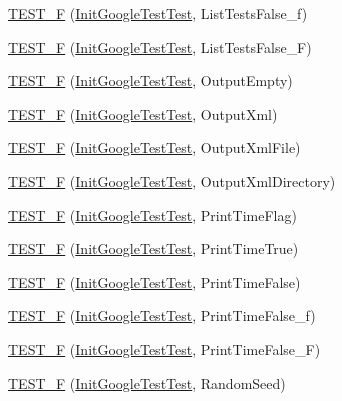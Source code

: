 \begin{DoxyCompactItemize}
\hyperlink{namespacetesting_a60e2b7e1cf88c2af6e04055b3afe7cbe}{T\+E\+S\+T\+\_\+F} (\hyperlink{classtesting_1_1_init_google_test_test}{Init\+Google\+Test\+Test}, List\+Tests\+False\+\_\+f)
\item 
\hyperlink{namespacetesting_a4933b012108ecb88243c2dbc13d7665b}{T\+E\+S\+T\+\_\+F} (\hyperlink{classtesting_1_1_init_google_test_test}{Init\+Google\+Test\+Test}, List\+Tests\+False\+\_\+F)
\item 
\hyperlink{namespacetesting_a121894d4edf72b1dbabdcde2bebd745d}{T\+E\+S\+T\+\_\+F} (\hyperlink{classtesting_1_1_init_google_test_test}{Init\+Google\+Test\+Test}, Output\+Empty)
\item 
\hyperlink{namespacetesting_a90df70c45f67d4c0dbc5bd29f7be3361}{T\+E\+S\+T\+\_\+F} (\hyperlink{classtesting_1_1_init_google_test_test}{Init\+Google\+Test\+Test}, Output\+Xml)
\item 
\hyperlink{namespacetesting_a810f99da1185404f8a899c919ee6433e}{T\+E\+S\+T\+\_\+F} (\hyperlink{classtesting_1_1_init_google_test_test}{Init\+Google\+Test\+Test}, Output\+Xml\+File)
\item 
\hyperlink{namespacetesting_ac351c3065ee89f7eb2fbba809db5c61d}{T\+E\+S\+T\+\_\+F} (\hyperlink{classtesting_1_1_init_google_test_test}{Init\+Google\+Test\+Test}, Output\+Xml\+Directory)
\item 
\hyperlink{namespacetesting_aa832ff8ffe6b687c7025cbc766973e0b}{T\+E\+S\+T\+\_\+F} (\hyperlink{classtesting_1_1_init_google_test_test}{Init\+Google\+Test\+Test}, Print\+Time\+Flag)
\item 
\hyperlink{namespacetesting_ae0f76bbca8e2bf7d9de60c4b8b0dfa16}{T\+E\+S\+T\+\_\+F} (\hyperlink{classtesting_1_1_init_google_test_test}{Init\+Google\+Test\+Test}, Print\+Time\+True)
\item 
\hyperlink{namespacetesting_a1ec71efef2639ccb137ac5b7ccd8c9d1}{T\+E\+S\+T\+\_\+F} (\hyperlink{classtesting_1_1_init_google_test_test}{Init\+Google\+Test\+Test}, Print\+Time\+False)
\item 
\hyperlink{namespacetesting_af87ac7e6dc7c0ea1d85eaa3a57358d29}{T\+E\+S\+T\+\_\+F} (\hyperlink{classtesting_1_1_init_google_test_test}{Init\+Google\+Test\+Test}, Print\+Time\+False\+\_\+f)
\item 
\hyperlink{namespacetesting_a337ddb6629adb42219e612b67d18c6f1}{T\+E\+S\+T\+\_\+F} (\hyperlink{classtesting_1_1_init_google_test_test}{Init\+Google\+Test\+Test}, Print\+Time\+False\+\_\+F)
\item 
\hyperlink{namespacetesting_a2a1e31fea507bdd6e011450e2f316bcf}{T\+E\+S\+T\+\_\+F} (\hyperlink{classtesting_1_1_init_google_test_test}{Init\+Google\+Test\+Test}, Random\+Seed)

\end{DoxyCompactItemize}
